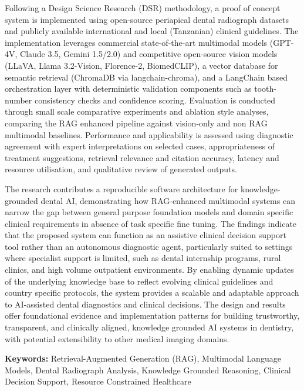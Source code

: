\documentclass[12pt,a4paper]{report}
\begin{document}
	Following a Design Science Research (DSR) methodology, a proof of concept system is implemented using open-source periapical dental radiograph datasets and publicly available international and local (Tanzanian) clinical guidelines. The implementation leverages commercial state-of-the-art multimodal models (GPT-4V, Claude 3.5, Gemini 1.5/2.0) and competitive open-source vision models (LLaVA, Llama 3.2-Vision, Florence-2, BiomedCLIP), a vector database for semantic retrieval (ChromaDB via langchain-chroma), and a LangChain based orchestration layer with deterministic validation components such as tooth-number consistency checks and confidence scoring. Evaluation is conducted through small scale comparative experiments and ablation style analyses, comparing the RAG enhanced pipeline against vision-only and non RAG multimodal baselines. Performance and applicability is assessed using diagnostic agreement with expert interpretations on selected cases, appropriateness of treatment suggestions, retrieval relevance and citation accuracy, latency and resource utilisation, and qualitative review of generated outputs.
	
	The research contributes a reproducible software architecture for knowledge-grounded dental AI, demonstrating how RAG-enhanced multimodal systems can narrow the gap between general purpose foundation models and domain specific clinical requirements in absence of task specific fine tuning. The findings indicate that the proposed system can function as an assistive clinical decision support tool rather than an autonomous diagnostic agent, particularly suited to settings where specialist support is limited, such as dental internship programs, rural clinics, and high volume outpatient environments. By enabling dynamic updates of the underlying knowledge base to reflect evolving clinical guidelines and country specific protocols, the system provides a scalable and adaptable approach to AI-assisted dental diagnostics and clinical decisions. The design and results offer foundational evidence and implementation patterns for building trustworthy, transparent, and clinically aligned, knowledge grounded AI systems in dentistry, with potential extensibility to other medical imaging domains.
	
	\vspace{1em}
	\noindent \textbf{Keywords:} Retrieval-Augmented Generation (RAG), Multimodal Language Models, Dental Radiograph Analysis, Knowledge Grounded Reasoning, Clinical Decision Support, Resource Constrained Healthcare
	
\end{document}
